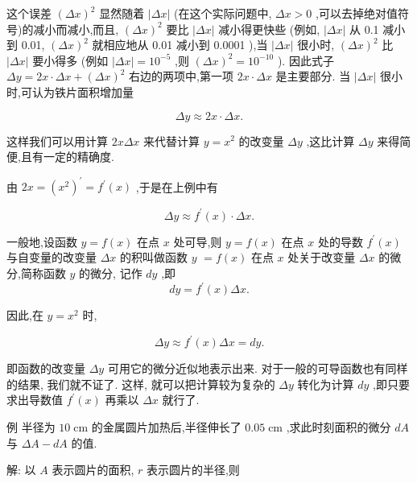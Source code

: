 \documentclass[lang=cn,newtx,12pt,scheme=chinese]{elegantbook}
\begin{document}
这个误差 \({\left( \Delta x\right) }^{2}\) 显然随着 \(\left| {\Delta x}\right|\) (在这个实际问题中, \({\Delta x} > 0\) ,可以去掉绝对值符号)的减小而减小,而且, \({\left( \Delta x\right) }^{2}\) 要比 \(\left| {\Delta x}\right|\) 减小得更快些 (例如, \(\left| {\Delta x}\right|\) 从 0.1 减小到 0.01, \({\left( \Delta x\right) }^{2}\) 就相应地从 0.01 减小到 0.0001 ),当 \(\left| {\Delta x}\right|\) 很小时, \({\left( \Delta x\right) }^{2}\) 比 \(\left| {\Delta x}\right|\) 要小得多 (例如 \(\left| {\Delta x}\right| = {10}^{-5}\) ,则 \({\left( \Delta x\right) }^{2} = {10}^{-{10}}\) ). 因此式子 \({\Delta y} = {2x} \cdot {\Delta x} + {\left( \Delta x\right) }^{2}\) 右边的两项中,第一项 \({2x} \cdot {\Delta x}\) 是主要部分. 当 \(\left| {\Delta x}\right|\) 很小时,可认为铁片面积增加量

\[
{\Delta y} \approx {2x} \cdot {\Delta x}.
\]

这样我们可以用计算 \({2x\Delta x}\) 来代替计算 \(y = {x}^{2}\) 的改变量 \({\Delta y}\) ,这比计算 \({\Delta y}\) 来得简便,且有一定的精确度.

由 \({2x} = {\left( {x}^{2}\right) }^{\prime } = {f}^{\prime }\left( x\right)\) ,于是在上例中有

\[
{\Delta y} \approx {f}^{\prime }\left( x\right) \cdot {\Delta x}. \tag{1'}
\]

\begin{definition}[微分]
一般地,设函数 \(y = f\left( x\right)\) 在点 \(x\) 处可导,则 \(y = f\left( x\right)\) 在点 \(x\) 处的导数 \({f}^{\prime }\left( x\right)\) 与自变量的改变量 \({\Delta x}\) 的积叫做函数 \(y\) \(= f\left( x\right)\) 在点 \(x\) 处关于改变量 \({\Delta x}\) 的微分,简称函数 \(y\) 的微分, 记作 \({dy}\) ,即
\[
{dy} = {f}^{\prime }\left( x\right) {\Delta x}. \tag{2}
\]
\end{definition}

因此,在 \(y = {x}^{2}\) 时,

\[
{\Delta y} \approx {f}^{\prime }\left( x\right) {\Delta x} = {dy}. \tag{2'}
\]


即函数的改变量 \({\Delta y}\) 可用它的微分近似地表示出来. 对于一般的可导函数也有同样的结果, 我们就不证了. 这样, 就可以把计算较为复杂的 \({\Delta y}\) 转化为计算 \({dy}\) ,即只要求出导数值 \({f}^{\prime }\left( x\right)\) 再乘以 \({\Delta x}\) 就行了.

例 半径为 \({10}\mathrm{\;{cm}}\) 的金属圆片加热后,半径伸长了 \({0.05}\mathrm{\;{cm}}\) ,求此时刻面积的微分 \({dA}\) 与 \({\Delta A} - {dA}\) 的值.

解: 以 \(A\) 表示圆片的面积, \(r\) 表示圆片的半径,则
\end{document}
